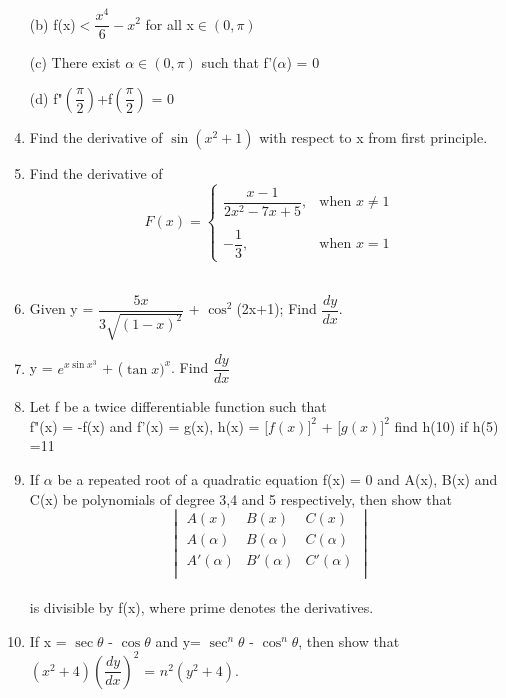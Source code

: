 \begin{enumerate}[label=\arabic*.,ref=\thesubsection.\theenumi]
	\item [(b)]f(x)$<\dfrac{x^4}{6}-x^2$ for all x$\in(0,\pi)$\\
	\item [(c)]There exist $\alpha \in (0,\pi)$ such that f'($\alpha$) = 0\\
	\item [(d)]f"$\left(\dfrac{\pi}{2}\right)$+f$\left(\dfrac{\pi}{2}\right)$ = 0\\
	\item Find the derivative of $\sin(x^2+1)$ with respect to x from first principle.\\
	\item Find the derivative of\\
	$$
	F(x)=
	\begin{cases}
	\dfrac{x-1}{2x^2-7x+5},   & \text{when $x \neq 1$}\\
	\\
	-\dfrac{1}{3},   &\text{when $x = 1$}
	\end{cases}
	$$
	\\
	\item Given y = $\dfrac{5x}{3\sqrt{(1-x)^2}}$ + $\cos^2$(2x+1); Find $\dfrac{dy}{dx}$.
	\item y = $e^{x\sin x^3}$ + ($\tan x)^x$. Find  $\dfrac{dy}{dx}$\\
	\item Let f be a twice differentiable function such that\\
	f"(x) = -f(x) and f'(x) = g(x), h(x) = [$f(x)]^2$ + [$g(x)]^2$
	find h(10) if h(5) =11\\
	\item If $\alpha$ be a repeated root of a quadratic equation f(x) = 0 and A(x), B(x) and C(x) be polynomials of degree 3,4 and 5 respectively, then show that \begin{equation*}
   \begin{vmatrix} 
   A(x) & B(x) & C(x)  \\
   A(\alpha) & B(\alpha) & C(\alpha)  \\
   A'(\alpha) & B'(\alpha) & C'(\alpha)  \\
   \end{vmatrix} 
\end{equation*}\\
	is divisible by f(x), where prime denotes the derivatives.\\
	\item If x = $\sec \theta$ - $\cos \theta$ and y= $\sec^n \theta$ - $\cos^n \theta$, then show that $(x^2 + 4)\left(\dfrac{dy}{dx}\right)^2$ = $n^2(y^2 + 4)$.\\

\end{enumerate}
